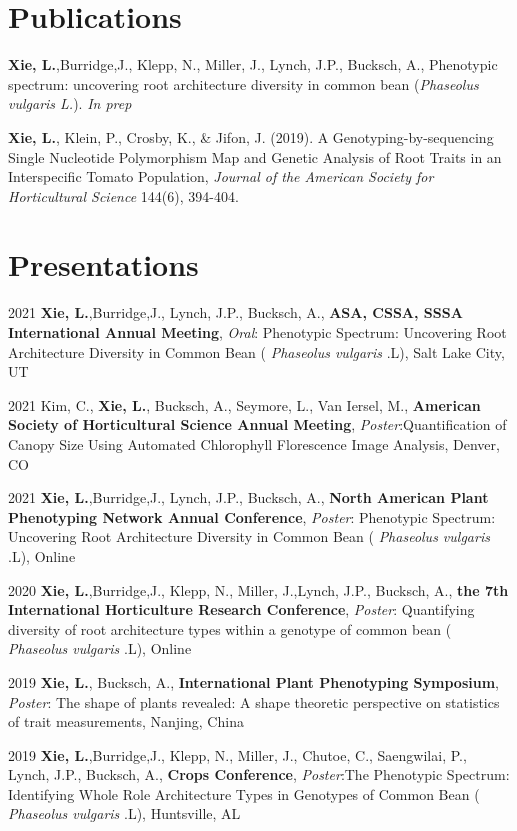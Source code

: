 \documentclass[11pt,a4paper,]{awesome-cv}
\begin{document}
\hypertarget{publications}{%
\section{Publications}\label{publications}}

\textbf{Xie, L.},Burridge,J., Klepp, N., Miller, J., Lynch, J.P.,
Bucksch, A., Phenotypic spectrum: uncovering root architecture diversity
in common bean (\emph{Phaseolus vulgaris L.}). \emph{In prep}

\textbf{Xie, L.}, Klein, P., Crosby, K., \& Jifon, J. (2019). A
Genotyping-by-sequencing Single Nucleotide Polymorphism Map and Genetic
Analysis of Root Traits in an Interspecific Tomato Population,
\emph{Journal of the American Society for Horticultural Science} 144(6),
394-404.

\hypertarget{presentations}{%
\section{Presentations}\label{presentations}}

2021 \textbf{Xie, L.},Burridge,J., Lynch, J.P., Bucksch, A.,
\textbf{ASA, CSSA, SSSA International Annual Meeting}, \emph{Oral}:
Phenotypic Spectrum: Uncovering Root Architecture Diversity in Common
Bean ( \emph{Phaseolus vulgaris} .L), Salt Lake City, UT

2021 Kim, C., \textbf{Xie, L.}, Bucksch, A., Seymore, L., Van Iersel,
M., \textbf{American Society of Horticultural Science Annual Meeting},
\emph{Poster}:Quantification of Canopy Size Using Automated Chlorophyll
Florescence Image Analysis, Denver, CO

2021 \textbf{Xie, L.},Burridge,J., Lynch, J.P., Bucksch, A.,
\textbf{North American Plant Phenotyping Network Annual Conference},
\emph{Poster}: Phenotypic Spectrum: Uncovering Root Architecture
Diversity in Common Bean ( \emph{Phaseolus vulgaris} .L), Online

2020 \textbf{Xie, L.},Burridge,J., Klepp, N., Miller, J.,Lynch, J.P.,
Bucksch, A., \textbf{the 7th International Horticulture Research
Conference}, \emph{Poster}: Quantifying diversity of root architecture
types within a genotype of common bean ( \emph{Phaseolus vulgaris} .L),
Online

2019 \textbf{Xie, L.}, Bucksch, A., \textbf{International Plant
Phenotyping Symposium}, \emph{Poster}: The shape of plants revealed: A
shape theoretic perspective on statistics of trait measurements,
Nanjing, China

2019 \textbf{Xie, L.},Burridge,J., Klepp, N., Miller, J., Chutoe, C.,
Saengwilai, P., Lynch, J.P., Bucksch, A., \textbf{Crops Conference},
\emph{Poster}:The Phenotypic Spectrum: Identifying Whole Role
Architecture Types in Genotypes of Common Bean ( \emph{Phaseolus
vulgaris} .L), Huntsville, AL
\end{document}

